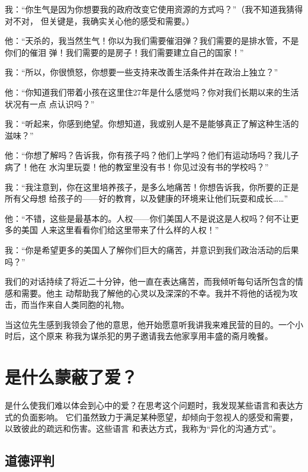 \documentclass{ctexart}
\renewenvironment{quotation}{\setlength{\parskip}{0.5em}\setstretch{1.5}\kaishu\zihao{-5}\setlength{\parindent}{1em}}{\vspace{1em}}
\begin{document}
\begin{quotation}
	我：``你生气是因为你想要我的政府改变它使用资源的方式吗？''（我不知道我猜得对不对，
	但关键是，我确实关心他的感受和需要。）

	他：``天杀的，我当然生气！你以为我们需要催泪弹？我们需要的是排水管，不是你们的催泪
	弹！我们需要的是房子！我们需要建立自己的国家！''

	我：``所以，你很愤怒，你想要一些支持来改善生活条件并在政治上独立？''

	他：``你知道我们带着小孩在这里住27年是什么感觉吗？你对我们长期以来的生活状况有一点
	点认识吗？''

	我：``听起来，你感到绝望。你想知道，我或别人是不是能够真正了解这种生活的滋味？''

	他：``你想了解吗？告诉我，你有孩子吗？他们上学吗？他们有运动场吗？我儿子病了！他在
	水沟里玩耍！他的教室里没有书！你见过没有书的学校吗？''

	我：``我注意到，你在这里培养孩子，是多么地痛苦！你想告诉我，你所要的正是所有父母想
	给孩子的------好的教育，以及健康的环境来让他们玩耍和成长\ldots\ldots''

	他：``不错，这些是最基本的。人权------你们美国人不是说这是人权吗？何不让更多的美国
	人来这里看看你们给这里带来了什么样的人权！''

	我：``你是希望更多的美国人了解你们巨大的痛苦，并意识到我们政治活动的后果吗？''
\end{quotation}

我们的对话持续了将近二十分钟，他一直在表达痛苦，而我倾听每句话所包含的情感和需要。他主
动帮助我了解他的心灵以及深深的不幸。我并不将他的话视为攻击，而当作来自人类同胞的礼物。

当这位先生感到我领会了他的意思，他开始愿意听我讲我来难民营的目的。一个小时后，这个原来
称我为谋杀犯的男子邀请我去他家享用丰盛的斋月晚餐。

\section{是什么蒙蔽了爱？}\label{sec:是什么蒙蔽了爱？}

是什么使我们难以体会到心中的爱？在思考这个问题时，我发现某些语言和表达方式的负面影响。
它们虽然致力于满足某种愿望，却倾向于忽视人的感受和需要，以致彼此的疏远和伤害。这些语言
和表达方式，我称为``异化的沟通方式''。

\subsection{道德评判}
\end{document}

